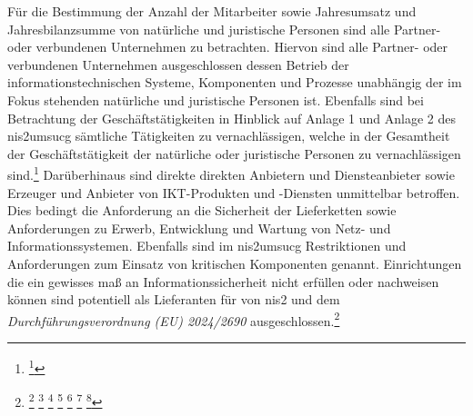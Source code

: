 \documentclass[11pt,a4paper,hidelinks]{article}   %
\begin{document}
        Für die Bestimmung der Anzahl der Mitarbeiter sowie Jahresumsatz und Jahresbilanzsumme von natürliche und juristische Personen sind alle Partner- oder verbundenen Unternehmen zu betrachten. Hiervon sind alle Partner- oder verbundenen Unternehmen ausgeschlossen dessen Betrieb der informationstechnischen Systeme, Komponenten und Prozesse unabhängig der im Fokus stehenden natürliche und juristische Personen ist. Ebenfalls sind bei Betrachtung der Geschäftstätigkeiten in Hinblick auf Anlage 1 und Anlage 2 des \gls{nis2umsucg} sämtliche Tätigkeiten zu vernachlässigen, welche in der Gesamtheit der Geschäftstätigkeit der natürliche oder juristische Personen zu vernachlässigen sind.\footnote{
            \footcite[Vgl. §28 Absatz 4 \& 3,][]{NIS2UmsuCG}
        }\medbreak
        Darüberhinaus sind direkte direkten Anbietern und Diensteanbieter sowie Erzeuger und Anbieter von IKT-Produkten und -Diensten unmittelbar betroffen. Dies bedingt die Anforderung an die Sicherheit der Lieferketten sowie Anforderungen zu Erwerb, Entwicklung und Wartung von Netz- und Informationssystemen. Ebenfalls sind im \gls{nis2umsucg} Restriktionen und Anforderungen zum Einsatz von kritischen Komponenten genannt. Einrichtungen die ein gewisses maß an Informationssicherheit nicht erfüllen oder nachweisen können sind potentiell als Lieferanten für von \gls{nis2} und dem \emph{Durchführungsverordnung (EU) 2024/2690} ausgeschlossen.\footnote{
            \footcite[Vgl. §30 Absatz 6,][]{NIS2UmsuCG} %
            \footcite[Vgl. §56 Absatz 3,][]{NIS2UmsuCG}
            \footcite[Vgl. Nummer 5.1.1. \& 5.1.2.,][, Anhang]{EU2024-2690}
            \footcite[Vgl. Nummer 5.1.4. \& 5.1.5.,][, Anhang]{EU2024-2690}
            \footcite[Vgl. Nummer 6.1.1. \& 6.1.2.,][, Anhang]{EU2024-2690}
            \footcite[Vgl. Nummer 6.1.1. \& 6.1.2.,][, Anhang]{EU2024-2690}
            \footcite[Vgl. Nummer 6.2.2 \& 6.2.3.,][, Anhang]{EU2024-2690}
        }
\end{document}
